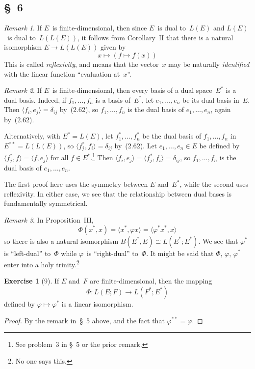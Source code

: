 \documentclass[letterpaper,12pt]{article}
\newcommand{\iso}{\cong}
\newcommand{\sprod}[2]{\langle#1,#2\rangle}
\theoremstyle{definition}
\newtheorem*{exer}{Exercise}
\theoremstyle{remark}
\newtheorem*{rmk}{Remark}
\begin{document}
\subsection*{\S~6}
\begin{rmk}
If \(E\)~is finite-dimensional, then since \(E\)~is dual to~\(L(E)\) and \(L(E)\)~is dual to~\(L(L(E))\), it follows from Corollary~II that there is a natural isomorphism \(E\to L(L(E))\) given by
\[x\mapsto(f\mapsto f(x))\]
This is called \emph{reflexivity}, and means that the vector~\(x\) may be naturally \emph{identified} with the linear function ``evaluation at~\(x\)''.
\end{rmk}

\begin{rmk}
If \(E\)~is finite-dimensional, then every basis of a dual space~\(E^*\) is a dual basis. Indeed, if \(f_1,\ldots,f_n\) is a basis of~\(E^*\), let \(e_1,\ldots,e_n\) be its dual basis in~\(E\). Then \(\sprod{f_i}{e_j}=\delta_{ij}\) by~(2.62), so \(f_1,\ldots,f_n\) is the dual basis of \(e_1,\ldots,e_n\), again by~(2.62).

Alternatively, with \(E^*=L(E)\), let \(f_1^*,\ldots,f_n^*\) be the dual basis of \(f_1,\ldots,f_n\) in \(E^{**}=L(L(E))\), so \(\sprod{f_j^*}{f_i}=\delta_{ij}\) by~(2.62). Let \(e_1,\ldots,e_n\in E\) be defined by \(\sprod{f_j^*}{f}=\sprod{f}{e_j}\) for all \(f\in E^*\).\footnote{See problem~3 in \S~5 or the prior remark.} Then \(\sprod{f_i}{e_j}=\sprod{f_j^*}{f_i}=\delta_{ij}\), so \(f_1,\ldots,f_n\) is the dual basis of \(e_1,\ldots,e_n\).

The first proof here uses the symmetry between \(E\) and~\(E^*\), while the second uses reflexivity. In either case, we see that the relationship between dual bases is fundamentally symmetrical.
\end{rmk}

\begin{rmk}
In Proposition~III,
\[\Phi(x^*,x)=\sprod{x^*}{\varphi x}=\sprod{\varphi^* x^*}{x}\]
so there is also a natural isomorphism \(B(E^*,E)\iso L(E^*;E^*)\). We see that \(\varphi^*\) is ``left-dual'' to~\(\Phi\) while \(\varphi\)~is ``right-dual'' to~\(\Phi\). It might be said that \(\Phi\), \(\varphi\), \(\varphi^*\) enter into a holy trinity.\footnote{No one says this.}
\end{rmk}

\begin{exer}[9]
If \(E\) and~\(F\) are finite-dimensional, then the mapping
\[\Phi:L(E;F)\to L(F^*;E^*)\]
defined by \(\varphi\mapsto\varphi^*\) is a linear isomorphism.
\end{exer}
\begin{proof}
By the remark in~\S~5 above, and the fact that \(\varphi^{**}=\varphi\).
\end{proof}
\end{document}
